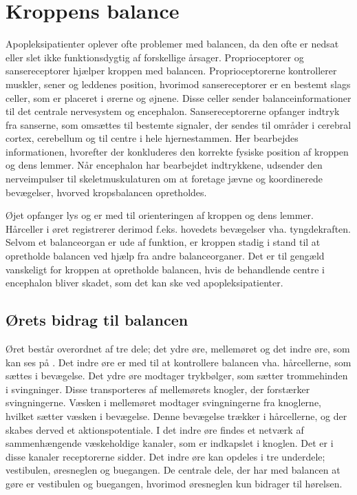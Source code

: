 \chapter{Kroppens balance}\label{app-Balance}
Apopleksipatienter oplever ofte problemer med balancen, da den ofte er nedsat eller slet ikke funktionsdygtig af forskellige årsager. \cite{Karnath2003} Proprioceptorer og sansereceptorer hjælper kroppen med balancen. Proprioceptorerne kontrollerer muskler, sener og leddenes position, hvorimod sansereceptorer er en bestemt slags celler, som er placeret i ørerne og øjnene. \cite{Martini2012} Disse celler sender balanceinformationer til det centrale nervesystem og encephalon. Sansereceptorerne opfanger indtryk fra sanserne, som omsættes til bestemte signaler, der sendes til områder i cerebral cortex, cerebellum og til centre i hele hjernestammen. Her bearbejdes informationen, hvorefter der konkluderes den korrekte fysiske position af kroppen og dens lemmer. Når encephalon har bearbejdet indtrykkene, udsender den nerveimpulser til skeletmuskulaturen om at foretage jævne og koordinerede bevægelser, hvorved kropsbalancen opretholdes.\cite{Martini2012}

Øjet opfanger lys og er med til orienteringen af kroppen og dens lemmer. Hårceller i øret registrerer derimod f.eks. hovedets bevægelser vha. tyngdekraften. Selvom et balanceorgan er ude af funktion, er kroppen stadig i stand til at opretholde balancen ved hjælp fra andre balanceorganer. Det er til gengæld vanskeligt for kroppen at opretholde balancen, hvis de behandlende centre i encephalon bliver skadet, som det kan ske ved apopleksipatienter. \cite{Martini2012} \\

\section{Ørets bidrag til balancen}
Øret består overordnet af tre dele; det ydre øre, mellemøret og det indre øre, som kan ses på . Det indre øre er med til at kontrollere balancen vha. hårcellerne, som sættes i bevægelse. Det ydre øre modtager trykbølger, som sætter trommehinden i svingninger. Disse transporteres af mellemørets knogler, der forstærker svingningerne. Væsken i mellemøret modtager svingningerne fra knoglerne, hvilket sætter væsken i bevægelse. Denne bevægelse trækker i hårcellerne, og der skabes derved et aktionspotentiale. I det indre øre findes et netværk af sammenhængende væskeholdige kanaler, som er indkapslet i knoglen. Det er i disse kanaler receptorerne sidder. Det indre øre kan opdeles i tre underdele; vestibulen, øresneglen og buegangen. De centrale dele, der har med balancen at gøre er vestibulen og buegangen, hvorimod øresneglen kun bidrager til hørelsen.\cite{Martini2012}

